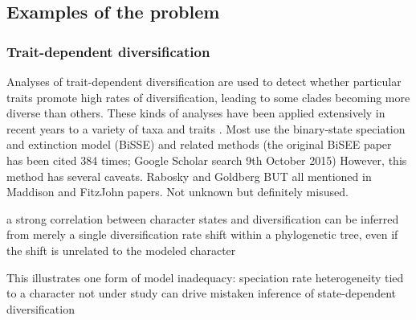 \documentclass[a4paper,12pt]{article}
\begin{document}
\subsection{Examples of the problem}
\subsubsection{Trait-dependent diversification} %

Analyses of trait-dependent diversification are used to detect whether particular traits promote high rates of diversification, leading to some clades becoming more diverse than others. 
These kinds of analyses have been applied extensively in recent years to a variety of taxa and traits \citep[e.g.][]{}. 
Most use the binary-state speciation and extinction model (BiSSE) and related methods (the original BiSEE paper \citealp{maddison2007estimating} has been cited 384 times; Google Scholar search 9th October 2015)
However, this method has several caveats. 
Rabosky and Goldberg BUT all mentioned in Maddison and FitzJohn papers. Not unknown but definitely misused.

a strong correlation
between character states and diversification can be
inferred from merely a single diversification rate
shift within a phylogenetic tree, even if the shift is
unrelated to the modeled character

This illustrates one
form of model inadequacy: speciation rate heterogeneity
tied to a character not under study can drive
mistaken inference of state-dependent diversification
\end{document}

